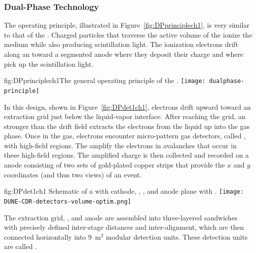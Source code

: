 \FloatBarrier
\subsubsection{Dual-Phase Technology}
\label{sec:fddp-exec-splar}

The  operating principle, illustrated in Figure~\ref{fig:DPprinciplech1}, is very similar to that of the . %
 Charged particles that traverse the active volume of the  ionize the medium while also producing scintillation light.  The ionization electrons drift along an \efield toward a segmented anode where they deposit their charge and where   pick up the scintillation light. 
 
 
\begin{dunefigure}{fig:DPprinciplech1}{The general operating principle of the  .}
\texttt{[image: dualphase-principle]}
\end{dunefigure}

In this design, shown in Figure~\ref{fig:DPdet1ch1}, electrons drift upward toward an extraction grid just below the liquid-vapor interface. 
After reaching the grid, an \efield stronger than the \dpnominaldriftfield{} drift field extracts the electrons from the liquid up into the gas phase. Once in the gas, electrons encounter micro-pattern gas detectors, called , with high-field regions. The  amplify the electrons in avalanches that occur in these high-field regions. The amplified charge is then collected and recorded on a \twod anode
consisting of two sets of %
gold-plated copper strips that provide the $x$ and $y$ coordinates (and thus two views) of an event. 

\begin{dunefigure}{fig:DPdet1ch1}
  {Schematic of a \nominalmodsize {}    with cathode, , , and anode plane with .}
  \texttt{[image: DUNE-CDR-detectors-volume-optim.png]}
\end{dunefigure}

 The extraction grid, , and anode are assembled into three-layered sandwiches with precisely defined inter-stage distances and inter-alignment,  which are then connected horizontally into \num{9}~m$^2$ modular detection units. These detection units are called .


